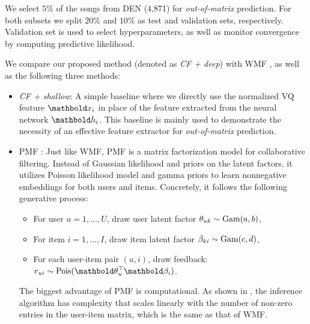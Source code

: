 We select $5\%$ of the songs from DEN (4,871) for \emph{out-of-matrix} prediction. For both subsets we split $20\%$ and $10\%$ as test and validation sets, respectively. Validation set is used to select hyperparameters, as well as monitor convergence by computing predictive likelihood.  

We compare our proposed method (denoted as \emph{CF + deep}) with \gls{WMF} \citep{hu2008collaborative}, as well as the following three methods: 

\begin{itemize}
 \item \emph{CF + shallow}: A simple baseline where we directly use the normalized VQ feature $\mb{x}_i$ in place of the feature extracted from the neural network $\mb{h}_i$. This baseline is mainly used to demonstrate the necessity of an effective feature extractor for \emph{out-of-matrix} prediction. 

\item \gls{PMF} \citep{Gopalan:2015}: Just like \gls{WMF}, \gls{PMF} is a matrix factorization model for collaborative filtering. Instead of Gaussian likelihood and priors on the latent factors, it utilizes Poisson likelihood model and gamma priors to learn nonnegative embeddings for both users and items. Concretely, it follows the following generative process:
\begin{itemize}
\item For user $u = 1, \dots, U$, draw user latent factor $\theta_{uk} \sim \mathrm{Gam}(a, b)$,
\item For item $i = 1, \dots, I$, draw item latent factor $\beta_{ki} \sim \mathrm{Gam}(c, d)$,
\item For each user-item pair $(u, i)$, draw feedback: $r_{ui} \sim \pois(\mb\theta_u^\top\mb\beta_i)$.
\end{itemize}
The biggest advantage of \gls{PMF} is computational. As shown in \citet{Gopalan:2015}, the inference algorithm has complexity that scales linearly with the number of non-zero entries in the user-item matrix, which is the same as that of \gls{WMF}.


\end{itemize}
